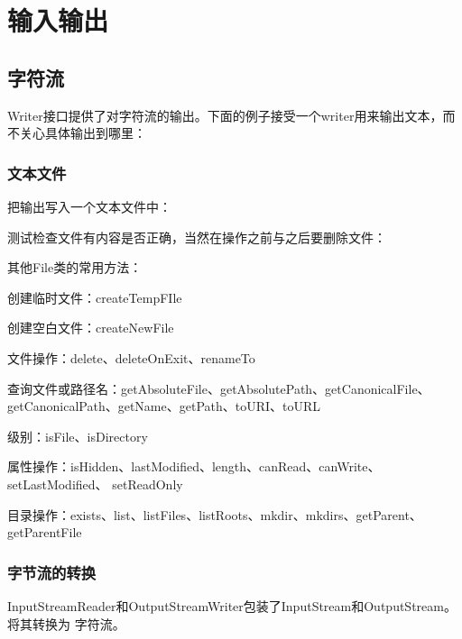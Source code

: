 \chapter{输入输出}



\section{字符流}

Writer接口提供了对字符流的输出。下面的例子接受一个writer用来输出文本，而不关心具体输出到哪里：







\subsection{文本文件}

把输出写入一个文本文件中：



测试检查文件有内容是否正确，当然在操作之前与之后要删除文件：



其他File类的常用方法：

创建临时文件：createTempFIle

创建空白文件：createNewFile

文件操作：delete、deleteOnExit、renameTo

查询文件或路径名：getAbsoluteFile、getAbsolutePath、getCanonicalFile、
getCanonicalPath、getName、getPath、toURI、toURL

级别：isFile、isDirectory

属性操作：isHidden、lastModified、length、canRead、canWrite、setLastModified、
setReadOnly

目录操作：exists、list、listFiles、listRoots、mkdir、mkdirs、getParent、
getParentFile



\subsection{字节流的转换}

InputStreamReader和OutputStreamWriter包装了InputStream和OutputStream。将其转换为
字符流。





